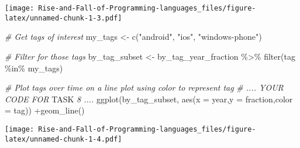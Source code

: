 \documentclass[
]{article}
\newenvironment{Shaded}{\begin{snugshade}}{\end{snugshade}}
\newcommand{\AlertTok}[1]{\textcolor[rgb]{0.94,0.16,0.16}{#1}}
\newcommand{\AttributeTok}[1]{\textcolor[rgb]{0.77,0.63,0.00}{#1}}
\newcommand{\CommentTok}[1]{\textcolor[rgb]{0.56,0.35,0.01}{\textit{#1}}}
\newcommand{\FunctionTok}[1]{\textcolor[rgb]{0.00,0.00,0.00}{#1}}
\newcommand{\NormalTok}[1]{#1}
\newcommand{\OtherTok}[1]{\textcolor[rgb]{0.56,0.35,0.01}{#1}}
\newcommand{\SpecialCharTok}[1]{\textcolor[rgb]{0.00,0.00,0.00}{#1}}
\newcommand{\StringTok}[1]{\textcolor[rgb]{0.31,0.60,0.02}{#1}}
\begin{document}
\texttt{[image: Rise-and-Fall-of-Programming-languages\_files/figure-latex/unnamed-chunk-1-3.pdf]}

\begin{Shaded}
\begin{Highlighting}[]
\CommentTok{\# Get tags of interest}
\NormalTok{my\_tags }\OtherTok{\textless{}{-}} \FunctionTok{c}\NormalTok{(}\StringTok{"android"}\NormalTok{, }\StringTok{"ios"}\NormalTok{, }\StringTok{"windows{-}phone"}\NormalTok{)}

\CommentTok{\# Filter for those tags}
\NormalTok{by\_tag\_subset }\OtherTok{\textless{}{-}}\NormalTok{ by\_tag\_year\_fraction }\SpecialCharTok{\%\textgreater{}\%}
  \FunctionTok{filter}\NormalTok{(tag }\SpecialCharTok{\%in\%}\NormalTok{ my\_tags)}

\CommentTok{\# Plot tags over time on a line plot using color to represent tag}
\CommentTok{\# .... YOUR CODE FOR }\AlertTok{TASK}\CommentTok{ 8 ....}
\FunctionTok{ggplot}\NormalTok{(by\_tag\_subset, }\FunctionTok{aes}\NormalTok{(}\AttributeTok{x =}\NormalTok{ year,}\AttributeTok{y =}\NormalTok{ fraction,}\AttributeTok{color =}\NormalTok{ tag)) }\SpecialCharTok{+}\FunctionTok{geom\_line}\NormalTok{()}
\end{Highlighting}
\end{Shaded}

\texttt{[image: Rise-and-Fall-of-Programming-languages\_files/figure-latex/unnamed-chunk-1-4.pdf]}
\end{document}
